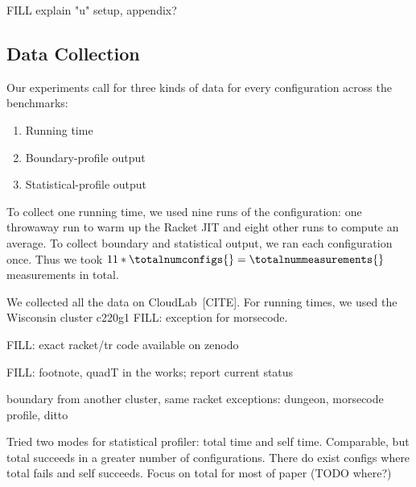 FILL explain "u" setup, appendix?




\subsection{Data Collection}


Our experiments call for three kinds of data for every configuration across the benchmarks:
\begin{enumerate}
  \item Running time
  \item Boundary-profile output
  \item Statistical-profile output
\end{enumerate}

To collect one running time, we used nine runs of the configuration:
one throwaway run to warm up the Racket JIT and eight other runs to compute an average.
To collect boundary and statistical output, we ran each configuration once.
Thus we took $11 * \totalnumconfigs{} = \totalnummeasurements{}$ measurements in total.

We collected all the data on CloudLab~[CITE].
For running times, we used the Wisconsin cluster c220g1 
FILL: exception for morsecode.

FILL: exact racket/tr code available on zenodo

FILL: footnote, quadT in the works; report current status

boundary from another cluster, same racket
exceptions: dungeon, morsecode
profile, ditto

Tried two modes for statistical profiler: total time and self time.
Comparable, but total succeeds in a greater number of configurations.
There do exist configs where total fails and self succeeds.
Focus on total for most of paper (TODO where?)


